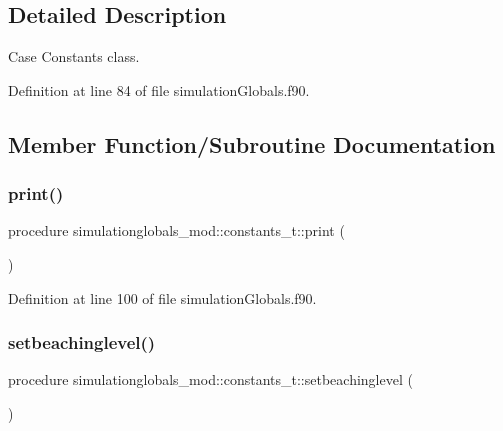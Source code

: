 \subsection{Detailed Description}
Case Constants class. 

Definition at line 84 of file simulation\+Globals.\+f90.



\subsection{Member Function/\+Subroutine Documentation}
\mbox{\label{structsimulationglobals__mod_1_1constants__t_a287a252cb5c736b4da24d79cf9c59897}} 
\subsubsection{\texorpdfstring{print()}{print()}}
{\footnotesize\ttfamily procedure simulationglobals\+\_\+mod\+::constants\+\_\+t\+::print (\begin{DoxyParamCaption}{ }\end{DoxyParamCaption})\hspace{0.3cm}{\ttfamily [private]}}



Definition at line 100 of file simulation\+Globals.\+f90.

\mbox{\label{structsimulationglobals__mod_1_1constants__t_a29fa4fda8d4382821d48942ea8232c15}} 
\subsubsection{\texorpdfstring{setbeachinglevel()}{setbeachinglevel()}}
{\footnotesize\ttfamily procedure simulationglobals\+\_\+mod\+::constants\+\_\+t\+::setbeachinglevel (\begin{DoxyParamCaption}{ }\end{DoxyParamCaption})\hspace{0.3cm}{\ttfamily [private]}}



